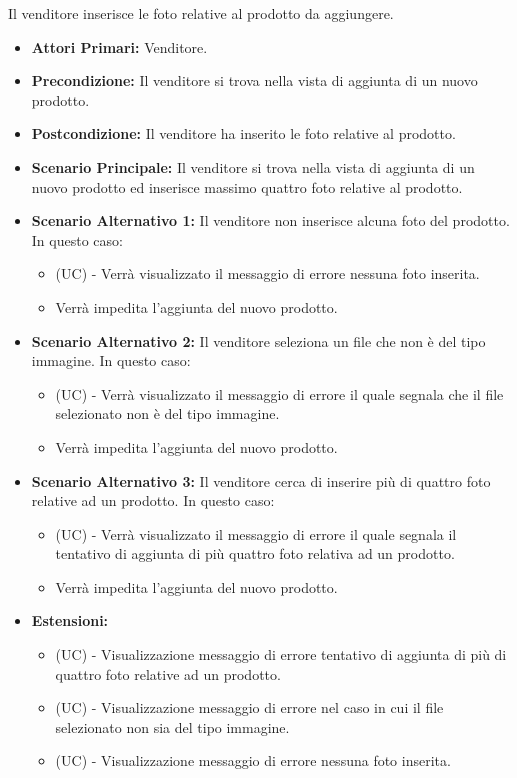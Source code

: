 Il venditore inserisce le foto relative al prodotto da aggiungere.
\begin{itemize}
    \item \textbf{Attori Primari:} Venditore.
    \item \textbf{Precondizione:} Il venditore si trova nella vista di aggiunta di un nuovo prodotto.
    \item \textbf{Postcondizione:} Il venditore ha inserito le foto relative al prodotto.
    \item \textbf{Scenario Principale:} Il venditore si trova nella vista di aggiunta di un nuovo prodotto ed inserisce massimo quattro foto relative al prodotto.
    \item \textbf{Scenario Alternativo 1:} Il venditore non inserisce alcuna foto del prodotto. In questo caso:
    \begin{itemize}
        \item (UC) - Verrà visualizzato il messaggio di errore nessuna foto inserita.
        \item Verrà impedita l'aggiunta del nuovo prodotto.
    \end{itemize}
    \item \textbf{Scenario Alternativo 2:} Il venditore seleziona un file che non è del tipo immagine. In questo caso:
    \begin{itemize}
        \item (UC) - Verrà visualizzato il messaggio di errore il quale segnala che il file selezionato non è del tipo immagine.
        \item Verrà impedita l'aggiunta del nuovo prodotto.
    \end{itemize}
    \item \textbf{Scenario Alternativo 3:} Il venditore cerca di inserire più di quattro foto relative ad un prodotto. In questo caso:
    \begin{itemize}
        \item (UC) - Verrà visualizzato il messaggio di errore il quale segnala il tentativo di aggiunta di più quattro foto relativa ad un prodotto.
        \item Verrà impedita l'aggiunta del nuovo prodotto.
    \end{itemize}
    \item \textbf{Estensioni:}
    \begin{itemize}
        \item (UC) - Visualizzazione messaggio di errore tentativo di aggiunta di più di quattro foto relative ad un prodotto.
        \item (UC) - Visualizzazione messaggio di errore nel caso in cui il file selezionato non sia del tipo immagine.
        \item (UC) - Visualizzazione messaggio di errore nessuna foto inserita.
    \end{itemize}
\end{itemize}

